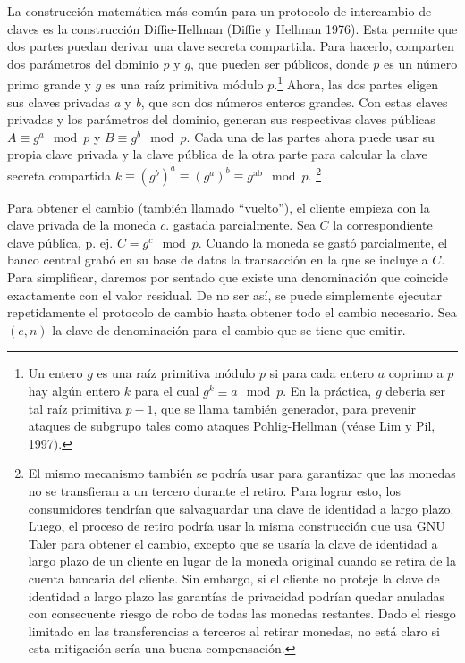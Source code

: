 \documentclass[10pt,spanish]{article}
\begin{document}
La construcción matemática más común para un protocolo de intercambio de
claves es la construcción Diffie-Hellman (Diffie y Hellman 1976). Esta
permite que dos partes puedan derivar una clave secreta compartida. Para
hacerlo, comparten dos parámetros del dominio $p$ y $g$, que
pueden ser públicos, donde $p$ es un número primo grande y $g$
es una raíz primitiva módulo $p$.\footnote{Un entero $g$ es una raíz
primitiva módulo $p$ si para cada entero $a$ coprimo a $p$ hay
algún entero $k$ para el cual
$g^k \equiv a \mod p$.
En la práctica, $g$ deberia ser tal raíz primitiva $p-1$, que se
llama también generador, para prevenir ataques de subgrupo tales como ataques
Pohlig-Hellman (véase Lim y Pil, 1997).} Ahora, las dos partes eligen sus claves
privadas \emph{a} y \emph{b}, que son dos números enteros grandes. Con estas claves
privadas y los parámetros del dominio, generan sus respectivas claves
públicas $A \equiv g^{a} \mod p$ y $B \equiv g^{b} \mod p$.
Cada una de las partes ahora puede usar su propia clave privada y la
clave pública de la otra parte para calcular la clave secreta compartida
$k \equiv \left( g^b \right)^{a} \equiv \left( g^{a} \right)^{b} \equiv g^{\text{ab}} \mod p$.
\footnote{El mismo mecanismo también se podría usar para garantizar que
las monedas no se transfieran a un tercero durante el retiro. Para
lograr esto, los consumidores tendrían que salvaguardar una clave de
identidad a largo plazo. Luego, el proceso de retiro podría usar la
misma construcción que usa GNU Taler para obtener el cambio, excepto
que se usaría la clave de identidad a largo plazo de un cliente en
lugar de la moneda original cuando se retira de la cuenta bancaria del
cliente. Sin embargo, si el cliente no proteje la clave de identidad a
largo plazo las garantías de privacidad podrían quedar anuladas con
consecuente riesgo de robo de todas las monedas restantes. Dado el
riesgo limitado en las transferencias a terceros al retirar monedas,
no está claro si esta mitigación sería una buena compensación.}

Para obtener el cambio (también llamado ``vuelto''), el cliente empieza
con la clave privada de la moneda $c$. gastada parcialmente. Sea $C$ la
correspondiente clave pública, p. ej.
$C = g^{c} \mod p$.
Cuando la moneda se gastó parcialmente, el banco central grabó en su base de
datos la transacción en la que se incluye a $C$. Para simplificar, daremos
por sentado que existe una denominación que coincide exactamente con el
valor residual. De no ser así, se puede simplemente ejecutar
repetidamente el protocolo de cambio hasta obtener todo el cambio
necesario. Sea $(e,n)$ la clave de denominación para el
cambio que se tiene que emitir.
\end{document}
